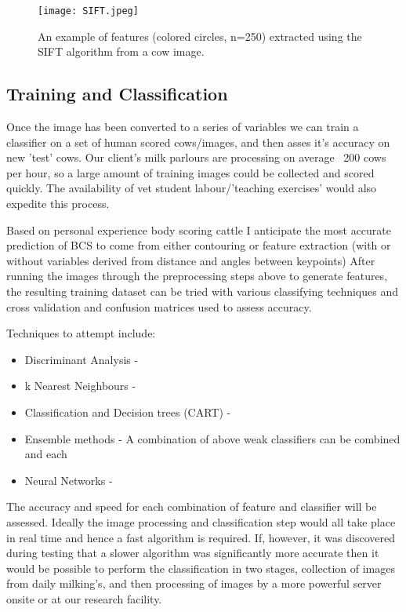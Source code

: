 \documentclass[11pt]{article}
\begin{document}
	\begin{figure}[h!]
		\centering
		\texttt{[image: SIFT.jpeg]}
		\caption{An example of features (colored circles, n=250) extracted  using the SIFT algorithm from a cow image.}
	\end{figure}


\subsection{Training and Classification}
	Once the image has been converted to a series of variables we can train a classifier on a set of human scored cows/images, and then asses it's accuracy on new 'test' cows.
	Our client's milk parlours are processing on average ~200 cows per hour, so a large amount of training images could be collected and scored quickly. 
	The availability of vet student labour/'teaching exercises' would also expedite this process.


	Based on personal experience body scoring cattle I anticipate the most accurate prediction of BCS to come from either contouring or feature extraction (with or without variables derived from distance and angles between keypoints)
	After running the images through the preprocessing steps above to generate features, the resulting training dataset can be tried with various classifying techniques and cross validation and confusion matrices used to assess accuracy.


	Techniques to attempt include: 

	\begin{itemize}
		\item Discriminant Analysis - 
		\item k Nearest Neighbours - 
		\item Classification and Decision trees (CART) - 
		\item Ensemble methods - A combination of above weak classifiers can be combined and each 
		\item Neural Networks - 
	\end{itemize}

	The accuracy and speed for each combination of feature and classifier will be assessed.
	Ideally the image processing and classification step would all take place in real time and hence a fast algorithm is required. 
	If, however, it was discovered during testing that a slower algorithm was significantly more accurate then it would be possible to perform the classification in two stages, collection of images from daily milking's, and then processing of images by a more powerful server onsite or at our research facility. 
\end{document}
